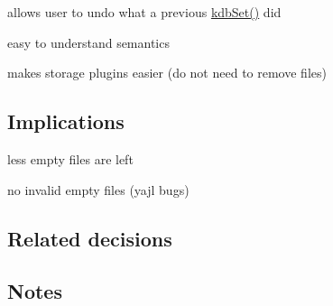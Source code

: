 \begin{DoxyItemize}
\item allows user to undo what a previous \hyperlink{group__kdb_ga11436b058408f83d303ca5e996832bcf}{kdb\+Set()} did
\item easy to understand semantics
\item makes storage plugins easier (do not need to remove files)
\end{DoxyItemize}

\subsection*{Implications}


\begin{DoxyItemize}
\item less empty files are left
\item no invalid empty files (yajl bugs)
\end{DoxyItemize}

\subsection*{Related decisions}

\subsection*{Notes}